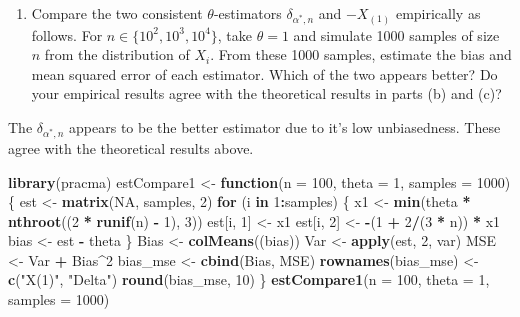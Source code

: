 \documentclass[12pt,]{article}
\newenvironment{Shaded}{\begin{snugshade}}{\end{snugshade}}
\newcommand{\ControlFlowTok}[1]{\textcolor[rgb]{0.13,0.29,0.53}{\textbf{#1}}}
\newcommand{\DataTypeTok}[1]{\textcolor[rgb]{0.13,0.29,0.53}{#1}}
\newcommand{\DecValTok}[1]{\textcolor[rgb]{0.00,0.00,0.81}{#1}}
\newcommand{\KeywordTok}[1]{\textcolor[rgb]{0.13,0.29,0.53}{\textbf{#1}}}
\newcommand{\NormalTok}[1]{#1}
\newcommand{\OperatorTok}[1]{\textcolor[rgb]{0.81,0.36,0.00}{\textbf{#1}}}
\newcommand{\OtherTok}[1]{\textcolor[rgb]{0.56,0.35,0.01}{#1}}
\newcommand{\StringTok}[1]{\textcolor[rgb]{0.31,0.60,0.02}{#1}}
\providecommand{\tightlist}{%
  \setlength{\itemsep}{0pt}\setlength{\parskip}{0pt}}
\begin{document}
\begin{enumerate}
\def\labelenumi{(\alph{enumi})}
\setcounter{enumi}{3}
\tightlist
\item
  Compare the two consistent \(\theta\)-estimators
  \(\delta_{\alpha^*,n}\) and \(-X_{(1)}\) empirically as follows. For
  \(n\in\{10^2, 10^3, 10^4\}\), take \(\theta = 1\) and simulate 1000
  samples of size \(n\) from the distribution of \(X_i\). From these
  1000 samples, estimate the bias and mean squared error of each
  estimator. Which of the two appears better? Do your empirical results
  agree with the theoretical results in parts (b) and (c)?
\end{enumerate}

The \(\delta_{\alpha^*,n}\) appears to be the better estimator due to
it's low unbiasedness. These agree with the theoretical results above.

\begin{Shaded}
\begin{Highlighting}[]
\KeywordTok{library}\NormalTok{(pracma)}
\NormalTok{estCompare1 <-}\StringTok{ }\ControlFlowTok{function}\NormalTok{(}\DataTypeTok{n =} \DecValTok{100}\NormalTok{, }\DataTypeTok{theta =} \DecValTok{1}\NormalTok{, }\DataTypeTok{samples =} \DecValTok{1000}\NormalTok{) \{}
\NormalTok{    est <-}\StringTok{ }\KeywordTok{matrix}\NormalTok{(}\OtherTok{NA}\NormalTok{, samples, }\DecValTok{2}\NormalTok{)}
    \ControlFlowTok{for}\NormalTok{ (i }\ControlFlowTok{in} \DecValTok{1}\OperatorTok{:}\NormalTok{samples) \{}
\NormalTok{        x1 <-}\StringTok{ }\KeywordTok{min}\NormalTok{(theta }\OperatorTok{*}\StringTok{ }\KeywordTok{nthroot}\NormalTok{((}\DecValTok{2} \OperatorTok{*}\StringTok{ }\KeywordTok{runif}\NormalTok{(n) }\OperatorTok{-}\StringTok{ }\DecValTok{1}\NormalTok{), }
            \DecValTok{3}\NormalTok{))}
\NormalTok{        est[i, }\DecValTok{1}\NormalTok{] <-}\StringTok{ }\NormalTok{x1}
\NormalTok{        est[i, }\DecValTok{2}\NormalTok{] <-}\StringTok{ }\OperatorTok{-}\NormalTok{(}\DecValTok{1} \OperatorTok{+}\StringTok{ }\DecValTok{2}\OperatorTok{/}\NormalTok{(}\DecValTok{3} \OperatorTok{*}\StringTok{ }\NormalTok{n)) }\OperatorTok{*}\StringTok{ }\NormalTok{x1}
\NormalTok{        bias <-}\StringTok{ }\NormalTok{est }\OperatorTok{-}\StringTok{ }\NormalTok{theta}
\NormalTok{    \}}
\NormalTok{    Bias <-}\StringTok{ }\KeywordTok{colMeans}\NormalTok{((bias))}
\NormalTok{    Var <-}\StringTok{ }\KeywordTok{apply}\NormalTok{(est, }\DecValTok{2}\NormalTok{, var)}
\NormalTok{    MSE <-}\StringTok{ }\NormalTok{Var }\OperatorTok{+}\StringTok{ }\NormalTok{Bias}\OperatorTok{^}\DecValTok{2}
\NormalTok{    bias_mse <-}\StringTok{ }\KeywordTok{cbind}\NormalTok{(Bias, MSE)}
    \KeywordTok{rownames}\NormalTok{(bias_mse) <-}\StringTok{ }\KeywordTok{c}\NormalTok{(}\StringTok{"X(1)"}\NormalTok{, }\StringTok{"Delta"}\NormalTok{)}
    \KeywordTok{round}\NormalTok{(bias_mse, }\DecValTok{10}\NormalTok{)}
\NormalTok{\}}
\KeywordTok{estCompare1}\NormalTok{(}\DataTypeTok{n =} \DecValTok{100}\NormalTok{, }\DataTypeTok{theta =} \DecValTok{1}\NormalTok{, }\DataTypeTok{samples =} \DecValTok{1000}\NormalTok{)}
\end{Highlighting}
\end{Shaded}
\end{document}
